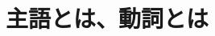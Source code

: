 \documentclass[aspectratio=169,xcolor={dvipsnames,table}]{beamer}
\begin{document}



\section{主語とは、動詞とは}
\end{document}
